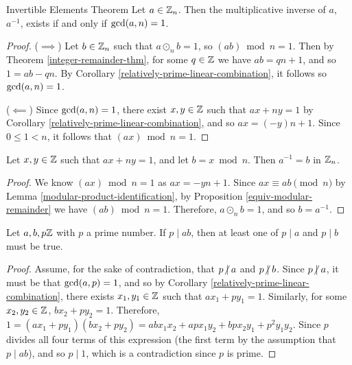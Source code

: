 \begin{thm} Invertible Elements Theorem \proofbreak
    Let $a \in \mathbb{Z}_n$. Then the multiplicative inverse of $a$, $a^{-1}$, exists if and only if $\operatorname{gcd}(a, n) = 1$.
\end{thm}

\begin{proof}\proofbreak
    ($\implies$) Let $b \in \mathbb{Z}_n$ such that $a \odot_n b = 1$, so $(ab) \bmod n = 1$. Then by Theorem \ref{integer-remainder-thm}, for some $q \in \mathbb{Z}$ we have $ab = qn + 1$, and so $1 = ab - qn$. By Corollary \ref{relatively-prime-linear-combination}, it follows so $\operatorname{gcd}(a, n) = 1$.

    ($\impliedby$) Since $\operatorname{gcd}(a, n) = 1$, there exist $x, y \in \mathbb{Z}$ such that $ax + ny = 1$ by Corollary \ref{relatively-prime-linear-combination}, and so $ax = (-y)n + 1$. Since $0 \leq 1 < n$, it follows that $(ax) \bmod n = 1$.
\end{proof}

\begin{cor}
    Let $x, y \in \mathbb{Z}$ such that $ax + ny = 1$, and let $b = x \bmod n$. Then $a^{-1} = b$ in $\mathbb{Z}_n$.
\end{cor}

\begin{proof}
    We know $(ax) \bmod n = 1$ as $ax = -yn + 1$. Since $ax \equiv ab \pmod n$ by Lemma \ref{modular-product-identification}, by Proposition \ref{equiv-modular-remainder} we have $(ab) \bmod n = 1$. Therefore, $a \odot_n b = 1$, and so $b = a^{-1}$.
\end{proof}

\begin{lemma}\label{prime-division-one}
    Let $a, b, p \mathbb{Z}$ with $p$ a prime number. If $p \mid ab$, then at least one of $p \mid a$ and $p \mid b$ must be true.
\end{lemma}

\begin{proof}
    Assume, for the sake of contradiction, that $p \centernot\mid a$ and $p \centernot\mid b$. Since $p \centernot\mid a$, it must be that $\operatorname{gcd}(a, p) = 1$, and so by Corollary \ref{relatively-prime-linear-combination}, there exists $x_1, y_1 \in \mathbb{Z}$ such that $ax_1 + py_1 = 1$. Similarly, for some $x_2, y_2 \in \mathbb{Z}$, $bx_2 + py_2 = 1$. Therefore, $1 = (ax_1 + py_1)(bx_2 + py_2) = abx_1x_2 + apx_1y_2 + bpx_2y_1 + p^2y_1y_2$. Since $p$ divides all four terms of this expression (the first term by the assumption that $p \mid ab$), and so $p \mid 1$, which is a contradiction since $p$ is prime.
\end{proof}

